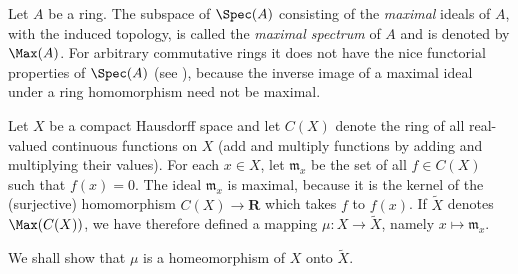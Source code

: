 \begin{exercise}
Let \(A\) be a ring.
The subspace of \(\Spec(A)\) consisting of the \emph{maximal} ideals of \(A\), with the induced topology, is called the \emph{maximal spectrum} of \(A\) and is denoted by \(\Max(A)\).
For arbitrary commutative rings it does not have the nice functorial properties of \(\Spec(A)\) (see ), because the inverse image of a maximal ideal under a ring homomorphism need not be maximal.

Let \(X\) be a compact Hausdorff space and let \(C(X)\) denote the ring of all real-valued continuous functions on \(X\) (add and multiply functions by adding and multiplying their values).
For each \(x\in X\), let \(\mathfrak{m}_x\) be the set of all \(f\in C(X)\) such that \(f(x)=0\).
The ideal \(\mathfrak{m}_x\) is maximal, because it is the kernel of the (surjective) homomorphism \(C(X)\to\mathbf{R}\) which takes \(f\) to \(f(x)\).
If \(\tilde{X}\) denotes \(\Max(C(X))\), we have therefore defined a mapping \(\mu:X\to\tilde{X}\), namely \(x\mapsto\mathfrak{m}_x\).

We shall show that \(\mu\) is a homeomorphism of \(X\) onto \(\tilde{X}\).
\end{exercise}
